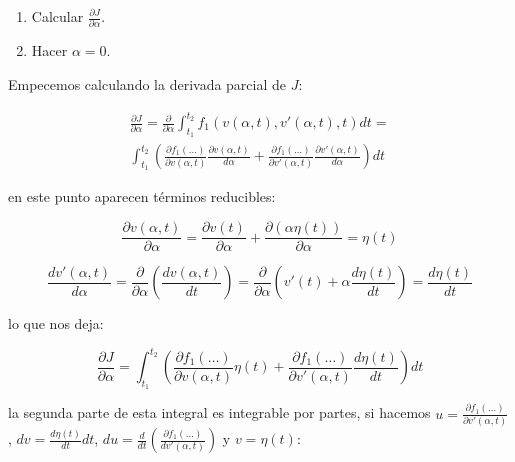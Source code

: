             \begin{enumerate}
                \item Calcular $\frac{\partial J}{\partial \alpha}$.
                \item Hacer $\alpha = 0$.
            \end{enumerate}

            Empecemos calculando la derivada parcial de $J$:

            \begin{multline*}
                \frac{\partial J}{\partial \alpha} = \frac{\partial}{\partial \alpha} \int_{t_1}^{t_2} f_1(v(\alpha, t), v'(\alpha, t), t)dt = \\
                \int_{t_1}^{t_2}\left( \frac{\partial f_1(\dots)}{\partial v(\alpha, t)} \frac{\partial v(\alpha, t)}{d \alpha} + \frac{\partial f_1(\dots)}{\partial v'(\alpha, t)} \frac{\partial v'(\alpha, t)}{d \alpha} \right) dt
            \end{multline*}

            en este punto aparecen términos reducibles:

            \begin{equation*}
                \frac{\partial v(\alpha, t)}{\partial \alpha} = \frac{\partial v(t)}{\partial \alpha} + \frac{\partial \left(\alpha \eta(t) \right)}{\partial \alpha} = \eta(t)
            \end{equation*}

            \begin{equation*}
                \frac{d v'(\alpha, t)}{d\alpha} = \frac{\partial}{\partial \alpha} \left( \frac{d v(\alpha, t)}{dt} \right) = \frac{\partial}{\partial \alpha} \left( v'(t) + \alpha \frac{d \eta(t)}{dt} \right) = \frac{d \eta(t)}{dt}
            \end{equation*}

            lo que nos deja:

            \begin{equation*}
                \frac{\partial J}{\partial \alpha} = \int_{t_1}^{t_2}\left( \frac{\partial f_1(\dots)}{\partial v(\alpha, t)} \eta(t) + \frac{\partial f_1(\dots)}{\partial v'(\alpha, t)} \frac{d \eta(t)}{dt} \right) dt
            \end{equation*}

            la segunda parte de esta integral es integrable por partes, si hacemos $u = \frac{\partial f_1(\dots)}{\partial v'(\alpha, t)}$, $dv = \frac{d\eta(t)}{dt}dt$, $du = \frac{d}{dt}\left( \frac{\partial f_1(\dots)}{dv'(\alpha, t)} \right)$ y $v = \eta(t)$:

